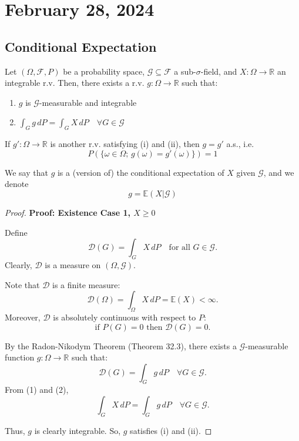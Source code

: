 \newpage
\section{February 28, 2024}
\subsection{Conditional Expectation}

\begin{theorem}
Let \((\Omega, \mathcal{F}, P)\) be a probability space, \(\mathcal{G} \subseteq \mathcal{F}\) a sub-\(\sigma\)-field, and \(X: \Omega \to \mathbb{R}\) an integrable r.v. Then, there exists a r.v. \(g: \Omega \to \mathbb{R}\) such that:
\begin{enumerate}
    \item \(g\) is \(\mathcal{G}\)-measurable and integrable
    \item \(\int_G g \, dP = \int_G X \, dP \quad \forall G \in \mathcal{G}\)
\end{enumerate}

If \(g': \Omega \to \mathbb{R}\) is another r.v. satisfying (i) and (ii), then \(g = g'\) a.s., i.e.
\[
P(\{\omega \in \Omega; \, g(\omega) = g'(\omega)\}) = 1
\]

We say that \(g\) is a (version of) the conditional expectation of \(X\) given \(\mathcal{G}\), and we denote
\[
g = \mathbb{E}(X | \mathcal{G})
\]
\end{theorem}

\begin{proof}
\textbf{Proof: Existence Case 1, \(X \ge 0\)}

Define
\[
\mathcal{D}(G) = \int_G X \, dP \quad \text{for all } G \in \mathcal{G}.
\]
Clearly, \(\mathcal{D}\) is a measure on \((\Omega, \mathcal{G})\).

Note that \(\mathcal{D}\) is a finite measure:
\[
\mathcal{D}(\Omega) = \int_\Omega X \, dP = \mathbb{E}(X) < \infty.
\]
Moreover, \(\mathcal{D}\) is absolutely continuous with respect to \(P\):
\[
\text{if } P(G) = 0 \text{ then } \mathcal{D}(G) = 0.
\]

By the Radon-Nikodym Theorem (Theorem 32.3), there exists a \(\mathcal{G}\)-measurable function \(g: \Omega \to \mathbb{R}\) such that:
\[
\mathcal{D}(G) = \int_G g \, dP \quad \forall G \in \mathcal{G}.
\]
From (1) and (2),
\[
\int_G X \, dP = \int_G g \, dP \quad \forall G \in \mathcal{G}.
\]

Thus, \(g\) is clearly integrable. So, \(g\) satisfies (i) and (ii).
\end{proof}

